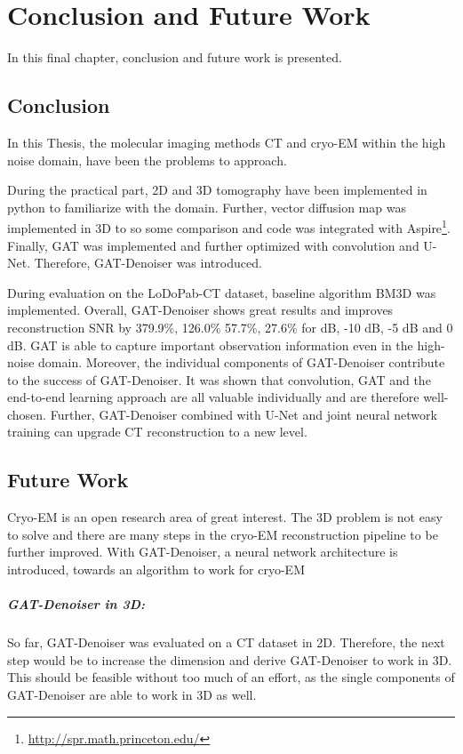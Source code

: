 \chapter{Conclusion and Future Work}
\label{sec:Conclusion}

In this final chapter, conclusion and future work is presented.

\section{Conclusion}

In this Thesis, the molecular imaging methods CT and cryo-EM
within the high noise domain, have been the problems to approach.

During the practical part, 2D and 3D tomography have been implemented 
in python to familiarize with the domain.
Further, vector diffusion map was implemented in 3D to so some comparison
and code was integrated with Aspire\footnote{\url{http://spr.math.princeton.edu/}}.
Finally, GAT was implemented and further optimized with convolution and U-Net.
Therefore, GAT-Denoiser was introduced.

During evaluation on the LoDoPab-CT dataset, baseline algorithm BM3D was implemented.
Overall, GAT-Denoiser shows great results and improves reconstruction SNR 
by 379.9\%, 126.0\% 57.7\%, 27.6\% for  dB, -10 dB, -5 dB and 0 dB.
GAT is able to capture important observation information even in the high-noise domain.
Moreover, the individual components of GAT-Denoiser contribute to the success of GAT-Denoiser.
It was shown that convolution, GAT and the end-to-end learning approach are all valuable individually
and are therefore well-chosen.
Further, GAT-Denoiser combined with U-Net and joint neural network training can upgrade CT reconstruction to a new level. 


\section{Future Work}
Cryo-EM is an open research area of great interest.
The 3D problem is not easy to solve and there are many steps in the cryo-EM reconstruction pipeline 
to be further improved. With GAT-Denoiser, a neural network architecture is introduced, 
towards an algorithm to work for cryo-EM

\paragraph{GAT-Denoiser in 3D:}
So far, GAT-Denoiser was evaluated on a CT dataset in 2D.
Therefore, the next step would be to increase the dimension and 
derive GAT-Denoiser to work in 3D. This should be feasible without too much of an effort,
as the single components of GAT-Denoiser are able to work in 3D as well.

